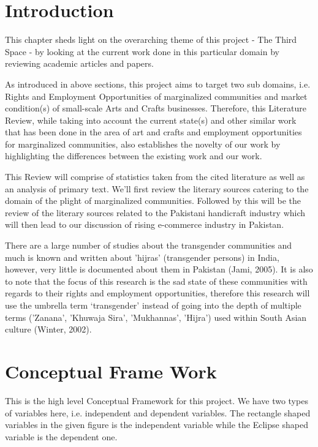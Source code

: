     
\section{Introduction}

This chapter sheds light on the overarching theme of this project - The Third Space - by looking at the current work done in this particular domain by reviewing academic articles and papers.

As introduced in above sections, this project aims to target two sub domains, i.e. Rights and Employment Opportunities of marginalized communities and market condition(s) of small-scale Arts and Crafts businesses. Therefore, this Literature Review, while taking into account the current state(s) and other similar work that has been done in the area of art and crafts and employment opportunities for marginalized communities, also establishes the novelty of our work by highlighting the differences between the existing work and our work.

This Review will comprise of statistics taken from the cited literature as well as an analysis of primary text. We'll first review the literary sources catering to the domain of the plight of marginalized communities. Followed by this will be the review of the literary sources related to the Pakistani handicraft industry which will then lead to our discussion of rising e-commerce industry in Pakistan.

There are a large number of studies about the transgender communities and much is known and written about 'hijras' (transgender persons) in India, however, very little is documented about them in Pakistan (Jami, 2005). It is also to note that the focus of this research is the sad state of these communities with regards to their rights and employment opportunities, therefore this research will use the umbrella term `transgender' instead of going into the depth of multiple terms ('Zanana', 'Khuwaja Sira', 'Mukhannas', 'Hijra') used within South Asian culture (Winter, 2002). 

\section{Conceptual Frame Work}

This is the high level Conceptual Framework for this project. We have two types of variables here, i.e. independent and dependent variables. The rectangle shaped variables in the given figure is the independent variable while the Eclipse shaped variable is the dependent one.

